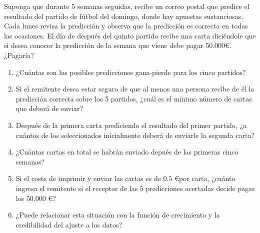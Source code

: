 \documentclass[11pt,leqno]{article}
\theoremstyle{definition}
\begin{document}
\begin{cuestion}
Suponga que durante 5 semanas seguidas, recibe un correo postal que predice el resultado del partido de fútbol del domingo, donde hay apuestas sustanciosas. Cada lunes revisa la predicción y observa que la predicción es correcta en todas las ocasiones. El día de después del quinto partido recibe una carta diciéndole que si desea conocer la predicción de la semana que viene debe pagar 50.000\euro. ¿Pagaría?
\begin{enumerate}[a]
\item ¿Cuántas son las posibles predicciones gana-pierde para los cinco partidos?
\item Si el remitente desea estar seguro de que al menos una persona recibe de él la predicción correcta sobre los 5 partidos, ¿cuál es el mínimo número de cartas que deberá de
enviar?
\item Después de la primera carta prediciendo el resultado del primer partido, ¿a cuántos de los seleccionados inicialmente deberá de enviarle la segunda carta?
\item ¿Cuántas cartas en total se habrán enviado depués de las primeras cinco semanas?
\item  Si el coste de imprimir y enviar las cartas es de $0.5$ \euro por carta, ¿cuánto ingresa el remitente si el receptor de las 5 predicciones acertadas decide pagar los $50.000$ \euro ?
\item ¿Puede relacionar esta situación con la función de crecimiento y la credibilidad del ajuste a los datos?
\end{enumerate}
\end{cuestion}
\end{document}

